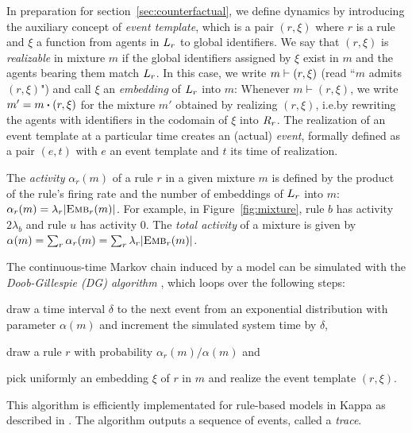 

In preparation for section~\ref{sec:counterfactual}, we define dynamics by
introducing the auxiliary concept of \emph{event template}, which is a pair $(r,
\xi)$ where $r$ is a rule and $\xi$ a function
from agents in $L_{r}$ to global identifiers. We say that
$(r, \xi)$ is \emph{realizable} in mixture $m$ if the global
identifiers assigned by $\xi$ exist in $m$ and the agents bearing them
match $L_{r}$. In this case, we write $m \vdash (r, \xi)$
(read ``$m$ admits $(r, \xi)$") and call $\xi$ an
\emph{embedding} of $L_{r}$ into $m$:
Whenever $m \vdash (r, \xi)$, we write $m'=\UPDATE{m}{(r, \xi)}$ for
the mixture $m'$ obtained by realizing $(r, \xi)$, i.e.\@ by rewriting
the agents with identifiers in the codomain of $\xi$ into $R_{r}$. The
realization of an event template at a particular time creates an (actual) \emph{event}, formally defined as a pair $(e, t)$ with $e$ an event template and $t$ its time of realization. 

The \emph{activity} $\alpha_r(m)$ of a rule $r$ in a given mixture $m$
is defined by the product of the rule's firing rate and the number of
embeddings of $L_{r}$ into $m$:
$\alpha_r(m)=\lambda_r|{\textsc{Emb}}_{r}(m)|$. For example, in
Figure~\ref{fig:mixture}, rule $b$ has activity $2\lambda_b$ and rule
$u$ has activity $0$. The \emph{total activity} of a mixture is given
by $\alpha(m)=\sum_r\alpha_r(m)=\sum_r\lambda_r|{\textsc{Emb}}_{r}(m)|$.

The continuous-time Markov chain induced by a model can be
simulated with the \emph{Doob-Gillespie (DG) algorithm}
\cite{gillespie1977exact}, which loops over the
following steps:
\begin{inparaenum}[(1)]
\item draw a time interval $\delta$ to the next event from an
  exponential distribution with parameter $\alpha(m)$ and increment
  the simulated system time by $\delta$,
\item draw a rule $r$ with probability $\alpha_r(m)/\alpha(m)$ and
\item pick uniformly an embedding $\xi$ of $r$ in $m$ and realize the
 event template $(r, \xi)$.
\end{inparaenum}
This algorithm is efficiently implementated for rule-based
models in Kappa as described in
\cite{DanosEtAl-APLAS07,BoutillierEK17}. The algorithm outputs a sequence of
events, called a \emph{trace}.

